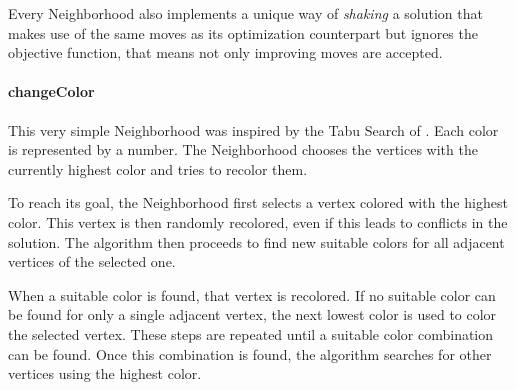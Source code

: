 \documentclass[paper=a4,fontsize=12pt]{scrartcl}
\begin{document}
Every Neighborhood also implements a unique way of \emph{shaking} a solution that makes use of the same moves as its optimization counterpart but ignores the objective function, that means not only improving moves are accepted.


\paragraph{changeColor}
This very simple Neighborhood was inspired by the Tabu Search of \citet*{Noronha2006}. Each color is represented by a number. The Neighborhood chooses the vertices with the currently highest color and tries to recolor them.


To reach its goal, the Neighborhood first selects a vertex colored with the highest color. This vertex is then randomly recolored, even if this leads to conflicts in the solution. The algorithm then proceeds to find new suitable colors for all adjacent vertices of the selected one. 


When a suitable color is found, that vertex is recolored. If no suitable color can be found for only a single adjacent vertex, the next lowest color is used to color the selected vertex. These steps are repeated until a suitable color combination can be found. Once this combination is found, the algorithm searches for other vertices using the highest color.

\end{document}
